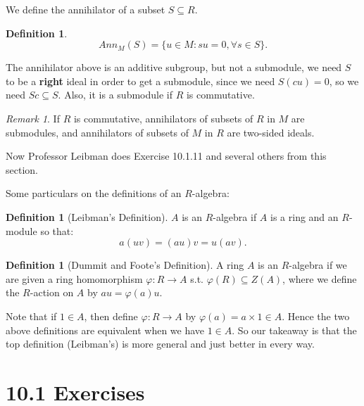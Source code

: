 \documentclass[12pt]{amsbook}
\theoremstyle{plain}
\numberwithin{section}{chapter}
\numberwithin{equation}{chapter}
\theoremstyle{definition}
\newtheorem{Def}[theorem]{Definition}
\theoremstyle{remark}
\newtheorem{rem}[theorem]{Remark}
\newcommand{\sub}{\subseteq}
\renewcommand{\phi}{\varphi}
\begin{document}
We define the annihilator of a subset $S \sub R$. 

\begin{Def}
$$
Ann_M(S) = \{u \in M: su = 0, \forall s \in S\}.
$$
\end{Def}

The annihilator above is an additive subgroup, but not a submodule, we need $S$ to be a \textbf{right} ideal in order to get a submodule, since we need $S(cu) = 0$, so we need $Sc \sub S$.  Also, it is a submodule if $R$ is commutative. 

\begin{rem}
If $R$ is commutative, annihilators of subsets of $R$ in $M$ are submodules, and annihilators of subsets of $M$ in $R$ are two-sided ideals. 
\end{rem}

Now Professor Leibman does Exercise 10.1.11 and several others from this section. 

Some particulars on the definitions of an $R$-algebra:

\begin{Def}[Leibman's Definition]
$A$ is an $R$-algebra if $A$ is a ring and an $R$-module so that:
$$
a(uv) = (au)v = u(av).
$$
\end{Def}

\begin{Def}[Dummit and Foote's Definition]
A ring $A$ is an $R$-algebra if we are given a ring homomorphism $\phi:R \to A$ s.t. $\phi(R) \sub Z(A)$, where we define the $R$-action on $A$ by $au = \phi(a)u$. 
\end{Def}

Note that if $1 \in A$, then define $\phi:R \to A$ by $\phi(a) = a \times 1 \in A$. Hence the two above definitions are equivalent when we have $1 \in A$. So our takeaway is that the top definition (Leibman's) is more general and just better in every way. 



\section*{10.1 Exercises}
\end{document}
